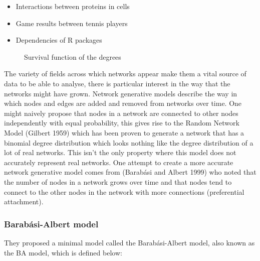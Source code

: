 \documentclass[
]{article}
\begin{document}
\begin{itemize}
\item
  Interactions between proteins in cells
\item
  Game results between tennis players
\item
  Dependencies of R packages
\end{itemize}

\begin{figure}[H]


\caption{\label{fig-survs}Survival function of the degrees}

\end{figure}%

The variety of fields across which networks appear make them a vital
source of data to be able to analyse, there is particular interest in
the way that the networks might have grown. Network generative models
describe the way in which nodes and edges are added and removed from
networks over time. One might naively propose that nodes in a network
are connected to other nodes independently with equal probability, this
gives rise to the Random Network Model (Gilbert 1959) which has been
proven to generate a network that has a binomial degree distribution
which looks nothing like the degree distribution of a lot of real
networks. This isn't the only property where this model does not
accurately represent real networks. One attempt to create a more
accurate network generative model comes from (Barabási and Albert 1999)
who noted that the number of nodes in a network grows over time and that
nodes tend to connect to the other nodes in the network with more
connections (preferential attachment).

\subsubsection{Barabási-Albert model}\label{barabuxe1si-albert-model}

They proposed a minimal model called the Barabási-Albert model, also
known as the BA model, which is defined below:
\end{document}
